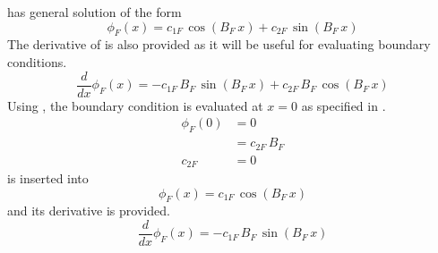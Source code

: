    has general solution of the form
  \begin{equation}
    \label{eq:2regF_general}
    \phi_F(x) = c_{1F} \, \cos(B_F\,x) + c_{2F} \, \sin(B_F\,x)
  \end{equation}
  The derivative of  is also provided as it will be
  useful for evaluating boundary conditions.
  \begin{equation}
    \label{eq:2regF_general_derivative}
    \frac{d}{dx}\phi_F(x) = -c_{1F} \, B_F \, \sin(B_F\,x) + 
      c_{2F} \, B_F \, \cos(B_F\,x)
  \end{equation}
  Using , the boundary condition is evaluated
  at $x=0$ as specified in .
  \begin{align}
    \phi_F(0) &= 0 \\
    &= c_{2F} \, B_F \\
    \label{eq:2reg_c2f}
    c_{2F} &= 0
  \end{align}
   is inserted into 
  \begin{equation}
    \label{eq:2regF_cos}
    \phi_F(x) = c_{1F} \, \cos(B_F\, x)
  \end{equation}
  and its derivative is provided.
  \begin{equation}
    \label{eq:2regF_cos_derivative}
    \frac{d}{dx} \phi_F(x) = -c_{1F} \, B_F \, \sin(B_F \, x)
  \end{equation}

